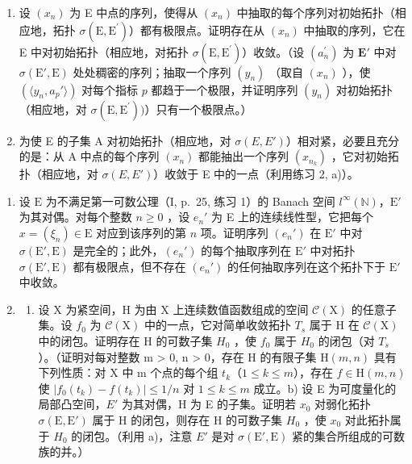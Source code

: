 \begin{enumerate}
\def\labelenumi{\alph{enumi})}
\setcounter{enumi}{1}
\item
  设 \((x_{n})\) 为 E 中点的序列，使得从 \((x_{n})\) 中抽取的每个序列对初始拓扑（相应地，拓扑 \(\sigma (\mathrm{E},\mathrm{E}^{\prime})\)）都有极限点。证明存在从 \((x_{n})\) 中抽取的序列，它在 E 中对初始拓扑（相应地，对拓扑 \(\sigma (\mathrm{E},\mathrm{E}^{\prime})\)）收敛。（设 \((a_n^{\prime})\) 为 \(\mathbf{E}'\) 中对 \(\sigma (\mathrm{E}',\mathrm{E})\) 处处稠密的序列；抽取一个序列 \((y_{n})\) （取自 \((x_{n})\) ），使 \((\langle y_n,a_p'\rangle)\) 对每个指标 \(p\) 都趋于一个极限，并证明序列 \((y_{n})\) 对初始拓扑（相应地，对 \(\sigma (\mathrm{E},\mathrm{E}^{\prime}))\)）只有一个极限点。）
\item
  为使 E 的子集 A 对初始拓扑（相应地，对 \(\sigma(E, E')\)）相对紧，必要且充分的是：从 A 中点的每个序列 \((x_n)\) 都能抽出一个序列 \((x_{n_k})\) ，它对初始拓扑（相应地，对 \(\sigma(E, E')\)）收敛于 E 中的一点（利用练习 2, a)）。
\end{enumerate}

\begin{enumerate}
\def\labelenumi{\arabic{enumi})}
\setcounter{enumi}{3}
\item
  设 \(\mathrm{E}\) 为不满足第一可数公理（I, p.~25, 练习 1）的 Banach 空间 \(l^{\infty}(\mathbb{N})\)，\(\mathrm{E}'\) 为其对偶。对每个整数 \(n \geqslant 0\) ，设 \(e_n'\) 为 E 上的连续线性型，它把每个 \(x = (\xi_n) \in \mathrm{E}\) 对应到该序列的第 \(n\) 项。证明序列 \((e_n')\) 在 \(\mathrm{E}'\) 中对 \(\sigma(\mathrm{E}', \mathrm{E})\) 是完全的；此外，\((e_n')\) 的每个抽取序列在 \(\mathrm{E}'\) 中对拓扑 \(\sigma(\mathrm{E}', \mathrm{E})\) 都有极限点，但不存在 \((e_n')\) 的任何抽取序列在这个拓扑下于 \(\mathrm{E}'\) 中收敛。
\item
  \begin{enumerate}
  \def\labelenumii{\alph{enumii})}
  \tightlist
  \item
    设 X 为紧空间，H 为由 X 上连续数值函数组成的空间 \(\mathcal{C}(\mathrm{X})\) 的任意子集。设 \(f_{0}\) 为 \(\mathcal{C}(\mathrm{X})\) 中的一点，它对简单收敛拓扑 \(T_{s}\) 属于 H 在 \(\mathcal{C}(\mathrm{X})\) 中的闭包。证明存在 H 的可数子集 \(H_{0}\) ，使 \(f_{0}\) 属于 \(H_{0}\) 的闭包（对 \(T_{s}\) ）。（证明对每对整数 m \textgreater{} 0, n \textgreater{} 0，存在 H 的有限子集 \(\mathrm{H}(m, n)\) 具有下列性质：对 X 中 m 个点的每个组 \(t_{k}\)（\(1 \leqslant k \leqslant m\)），存在 \(f \in \mathrm{H}(m, n)\) 使 \(|f_{0}(t_{k}) - f(t_{k})| \leqslant 1/n\) 对 \(1 \leqslant k \leqslant m\) 成立。b) 设 E 为可度量化的局部凸空间，\(E'\) 为其对偶，H 为 E 的子集。证明若 \(x_{0}\) 对弱化拓扑 \(\sigma(\mathrm{E}, \mathrm{E}')\) 属于 H 的闭包，则存在 H 的可数子集 \(H_{0}\) ，使 \(x_{0}\) 对此拓扑属于 \(H_{0}\) 的闭包。（利用 a)，注意 \(E'\) 是对 \(\sigma(\mathrm{E}', \mathrm{E})\) 紧的集合所组成的可数族的并。）
  \end{enumerate}
\end{enumerate}

